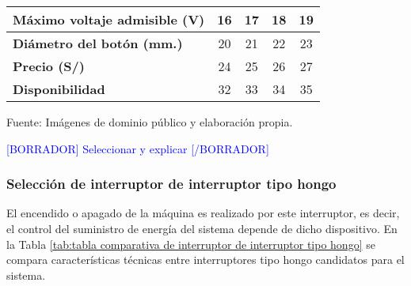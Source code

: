\begin{mytable}[H]
\begin{tabular}{l|c|c|c|c|}
		\multicolumn{1}{|l|}{
			\begin{minipage}{\myforthmaxsizeofcontenttable}			
				\textbf{Máximo voltaje admisible (V)}
			\end{minipage}
		}
		&
		16
		& 17         & 18         & 19         \\ \hline
		\multicolumn{1}{|l|}{
			\begin{minipage}{\myforthmaxsizeofcontenttable}			
				\textbf{Diámetro del botón (mm.)}
			\end{minipage}
		} & 20                                                                    & 21         & 22         & 23         \\ \hline
		\multicolumn{1}{|l|}{\textbf{Precio (S/)}}              & 24                                                                    & 25         & 26         & 27         \\ \hline
		\multicolumn{1}{|l|}{\textbf{Disponibilidad}}           & 32                                                                    & 33         & 34         & 35         \\ \hline
	\end{tabular}
	\begin{flushleft}	
		Fuente: Imágenes de dominio público y elaboración propia.
	\end{flushleft}
\end{mytable}

\textcolor{blue}{[BORRADOR] Seleccionar y explicar [/BORRADOR]}


\subsubsection{Selección de interruptor de interruptor tipo hongo}

El encendido o apagado de la máquina es realizado por este interruptor, es decir, el control del suministro de energía del sistema depende de dicho dispositivo. En la Tabla \ref{tab:tabla comparativa de interruptor de interruptor tipo hongo} se compara características técnicas entre interruptores tipo hongo candidatos para el sistema.


